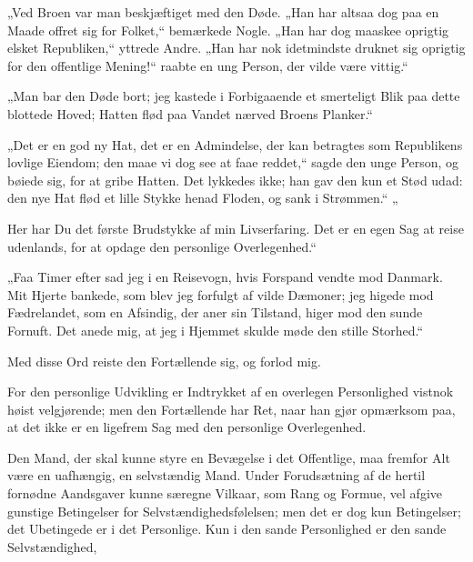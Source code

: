 \documentclass[12pt,a4paper]{book}
\newcommand{\apage}[1]{\marginnote{\footnotesize\textit{[#1]}}}
\begin{document}
„Ved Broen var man beskjæftiget med den Døde. „Han har altsaa dog
paa en Maade offret sig for Folket,“ bemærkede Nogle. „Han har dog
maaskee oprigtig elsket Republiken,“ yttrede Andre. „Han har nok
idetmindste druknet sig oprigtig for den offentlige Mening!“ raabte
en ung Person, der vilde være vittig.“

„Man bar den Døde bort; jeg kastede i Forbigaaende et smerteligt
Blik paa dette blottede Hoved; Hatten flød paa Vandet nærved Broens
Planker.“

„Det er en god ny Hat, det er en Admindelse, der kan betragtes som
Republikens lovlige Eiendom; den maae vi dog see at faae reddet,“
sagde den unge Person, og bøiede sig, for at gribe Hatten. Det
lykkedes ikke; han gav den kun et Stød udad: den nye Hat flød et
lille Stykke henad Floden, og sank i Strømmen.“
 \apage{62}
„

Her har Du det første Brudstykke af min Livserfaring. Det er en
egen Sag at reise udenlands, for at opdage den personlige
Overlegenhed.“

„Faa Timer efter sad jeg i en Reisevogn, hvis Forspand vendte mod
Danmark. Mit Hjerte bankede, som blev jeg forfulgt af vilde
Dæmoner; jeg higede mod Fædrelandet, som en Afsindig, der aner sin
Tilstand, higer mod den sunde Fornuft. Det anede mig, at jeg i
Hjemmet skulde møde den stille Storhed.“

Med disse Ord reiste den Fortællende sig, og forlod mig.

For den personlige Udvikling er Indtrykket af en overlegen
Personlighed vistnok høist velgjørende; men den Fortællende har Ret,
naar han gjør opmærksom paa, at det ikke er en ligefrem Sag med den
personlige Overlegenhed.

Den Mand, der skal kunne styre en Bevægelse i det Offentlige, maa
fremfor Alt være en uafhængig, en selvstændig Mand. Under
Forudsætning af de hertil fornødne Aandsgaver kunne særegne Vilkaar,
som Rang og Formue, vel afgive gunstige Betingelser for
Selvstændighedsfølelsen; men det er dog kun Betingelser; det
Ubetingede er i det Personlige. Kun i den sande Personlighed er den
sande Selvstændighed,
\end{document}
